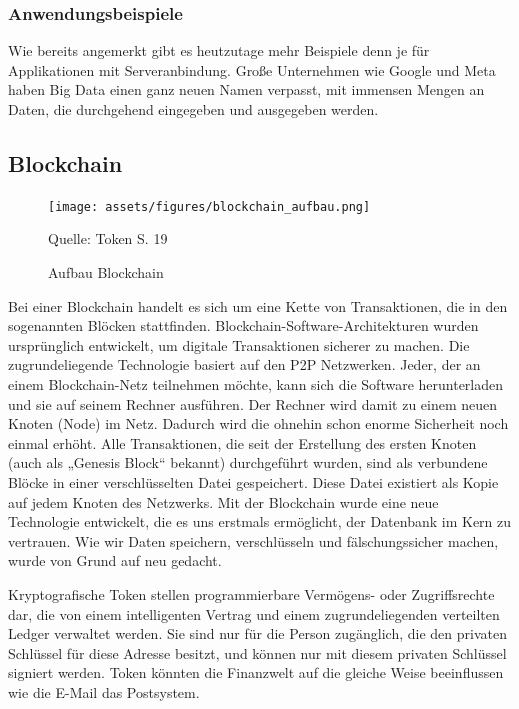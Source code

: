 \subsubsection{Anwendungsbeispiele}
Wie bereits angemerkt gibt es heutzutage mehr Beispiele denn je für Applikationen mit Serveranbindung.
Große Unternehmen wie Google und Meta haben Big Data einen ganz neuen Namen verpasst, mit immensen Mengen an Daten, die durchgehend eingegeben und ausgegeben werden.




\newpage

\subsection{Blockchain}
\begin{figure}[!ht]
    \caption{Aufbau Blockchain}
    \texttt{[image: assets/figures/blockchain\_aufbau.png]}
    \begin{flushleft}
        Quelle: Token S. 19
    \end{flushleft}
    \label{fig:birds1}
\end{figure}

Bei einer Blockchain handelt es sich um eine Kette von Transaktionen, die in den sogenannten Blöcken stattfinden. Blockchain-Software-Architekturen wurden ursprünglich entwickelt, um digitale Transaktionen sicherer zu machen. Die zugrundeliegende Technologie basiert auf den P2P Netzwerken. Jeder, der an einem Blockchain-Netz teilnehmen möchte, kann sich die Software herunterladen und sie auf seinem Rechner ausführen. Der Rechner wird damit zu einem neuen Knoten (Node) im Netz. Dadurch wird die ohnehin schon enorme Sicherheit noch einmal erhöht. Alle Transaktionen, die seit der Erstellung des ersten Knoten (auch als  „Genesis Block“ bekannt) durchgeführt wurden, sind als verbundene Blöcke in einer verschlüsselten Datei gespeichert. Diese Datei existiert als Kopie auf jedem Knoten des Netzwerks. Mit der Blockchain wurde eine neue Technologie entwickelt, die es uns erstmals ermöglicht, der Datenbank im Kern zu vertrauen. Wie wir Daten speichern, verschlüsseln und fälschungssicher machen, wurde von Grund auf neu gedacht.

Kryptografische Token stellen programmierbare Vermögens- oder Zugriffsrechte dar, die von einem intelligenten Vertrag und einem zugrundeliegenden verteilten Ledger verwaltet werden.
Sie sind nur für die Person zugänglich, die den privaten Schlüssel für diese Adresse besitzt, und können nur mit diesem privaten Schlüssel signiert werden.
Token  könnten  die  Finanzwelt  auf  die  gleiche  Weise  beeinflussen  wie  die  E-Mail  das Postsystem.

